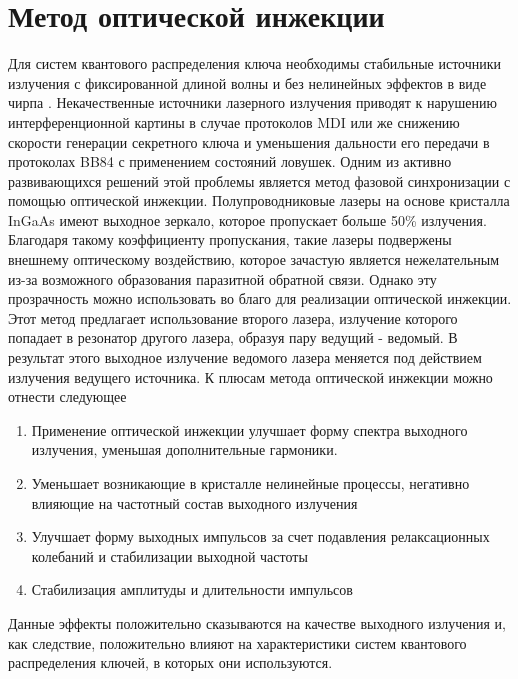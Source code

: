 \section{Метод оптической инжекции}\label{sec:ch2/sect1}
Для систем квантового распределения ключа необходимы стабильные источники излучения с фиксированной длиной волны и без нелинейных эффектов в виде чирпа \cite{comandar2016}. Некачественные источники лазерного излучения приводят к нарушению интерференционной  картины в случае протоколов MDI или же снижению скорости генерации секретного ключа и уменьшения дальности его передачи в протоколах BB84 с применением состояний ловушек. Одним из активно развивающихся решений этой проблемы является метод фазовой синхронизации с помощью оптической инжекции. 
\newline Полупроводниковые лазеры  на основе кристалла InGaAs имеют выходное зеркало, которое пропускает больше 50\% излучения. Благодаря такому коэффициенту пропускания, такие лазеры подвержены внешнему оптическому воздействию, которое зачастую является нежелательным из-за возможного образования паразитной обратной связи. Однако эту прозрачность можно использовать во благо для реализации оптической инжекции. Этот метод предлагает использование второго лазера, излучение которого попадает в резонатор другого лазера, образуя пару ведущий - ведомый. В результат этого выходное излучение ведомого лазера меняется под действием излучения ведущего источника. К плюсам метода оптической инжекции можно отнести следующее
\begin{enumerate}
    \item Применение оптической инжекции улучшает форму спектра выходного излучения, уменьшая дополнительные гармоники.
    \item Уменьшает возникающие в кристалле нелинейные процессы, негативно влияющие на частотный состав выходного излучения
    \item Улучшает форму выходных импульсов за счет подавления релаксационных колебаний и стабилизации выходной частоты
    \item Стабилизация амплитуды и длительности импульсов
\end{enumerate}
Данные эффекты положительно сказываются на качестве выходного излучения и, как следствие, положительно влияют на характеристики систем квантового распределения ключей, в которых они используются.
